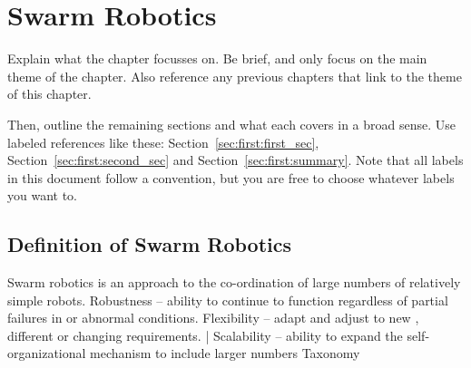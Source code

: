 
\chapter{Swarm Robotics }
\label{chap:initial}


Explain what the chapter focusses on. Be brief, and only focus on the main theme of the chapter. Also reference any previous chapters that link to the theme of this chapter.

Then, outline the remaining sections and what each covers in a broad sense. Use labeled references like these: Section~\ref{sec:first:first_sec}, Section~\ref{sec:first:second_sec} and Section~\ref{sec:first:summary}. Note that all labels in this document follow a convention, but you are free to choose whatever labels you want to.


\section{Definition of Swarm Robotics}

Swarm robotics is an approach to the co-ordination of large numbers of relatively simple robots. 
Robustness – ability to continue to function regardless of partial failures in or abnormal conditions. Flexibility – adapt and adjust to new , different or changing requirements. |
Scalability – ability to expand the self-organizational mechanism to include larger numbers
Taxonomy

